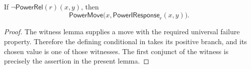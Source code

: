 \begin{lemma}
If $\neg\mathsf{PowerRel}(r)(x,y)$, then
\[
\mathsf{PowerMove}\bigl(x,\mathsf{PowerIResponse}_r(x,y)\bigr).
\]
\end{lemma}
\begin{proof}
The witness lemma  supplies a move with the
required universal failure property.  Therefore the defining conditional in
 takes its positive branch, and its chosen value is
one of those witnesses.  The first conjunct of the witness is precisely the
assertion in the present lemma.
\end{proof}
